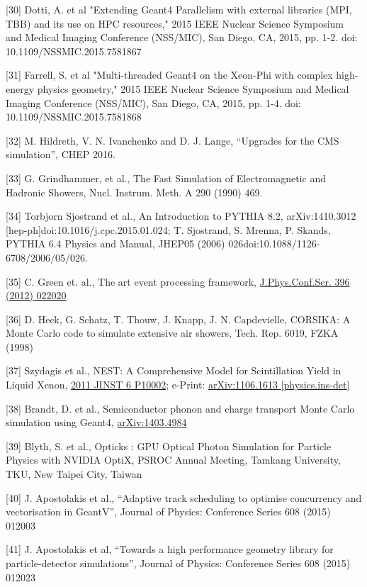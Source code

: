 \documentclass[12pt,a4paper]{article}
\begin{document}
{[}30{]} Dotti, A. et al "Extending Geant4 Parallelism with external
libraries (MPI, TBB) and its use on HPC resources," 2015 IEEE Nuclear
Science Symposium and Medical Imaging Conference (NSS/MIC), San Diego,
CA, 2015, pp. 1-2. doi: 10.1109/NSSMIC.2015.7581867

{[}31{]} Farrell, S. et al "Multi-threaded Geant4 on the Xeon-Phi with
complex high-energy physics geometry," 2015 IEEE Nuclear Science
Symposium and Medical Imaging Conference (NSS/MIC), San Diego, CA, 2015,
pp. 1-4. doi: 10.1109/NSSMIC.2015.7581868

{[}32{]} M. Hildreth, V. N. Ivanchenko and D. J. Lange, ``Upgrades for
the CMS simulation'', CHEP 2016.

{[}33{]} G. Grindhammer, et al., The Fast Simulation of Electromagnetic
and Hadronic Showers, Nucl. Instrum. Meth. A 290 (1990) 469.

{[}34{]} Torbjorn Sjostrand et al., An Introduction to PYTHIA 8.2,
arXiv:1410.3012 {[}hep-ph{]}doi:10.1016/j.cpc.2015.01.024; T. Sjostrand,
S. Mrenna, P. Skands, PYTHIA 6.4 Physics and Manual, JHEP05 (2006)
026doi:10.1088/1126-6708/2006/05/026.

{[}35{]} C. Green et. al., The art event processing framework,
\href{https://inspirehep.net/record/1211020}{J.Phys.Conf.Ser. 396 (2012)
022020}

{[}36{]} D. Heck, G. Schatz, T. Thouw, J. Knapp, J. N. Capdevielle,
CORSIKA: A Monte Carlo code to simulate extensive air showers, Tech.
Rep. 6019, FZKA (1998)

{[}37{]} Szydagis et al., NEST: A Comprehensive Model for Scintillation
Yield in Liquid Xenon,
\href{http://dx.doi.org/10.1088/1748-0221/6/10/P10002}{{2011 JINST 6
P10002}}; e-Print:
\href{http://arxiv.org/abs/1106.1613}{{arXiv:1106.1613
{[}physics.ins-det{]}}}

{[}38{]} Brandt, D. et al., Semiconductor phonon and charge transport
Monte Carlo simulation using Geant4,
\href{https://arxiv.org/abs/1403.4984}{{arXiv:1403.4984}}

{[}39{]} Blyth, S. et al., Opticks : GPU Optical Photon Simulation for
Particle Physics with NVIDIA OptiX, PSROC Annual Meeting, Tamkang
University, TKU, New Taipei City, Taiwan

{[}40{]} J. Apostolakis et al., ``Adaptive track scheduling to optimise
concurrency and vectorisation in GeantV'', Journal of Physics:
Conference Series 608 (2015) 012003

{[}41{]} J. Apostolakis et al, ``Towards a high performance geometry
library for particle-detector simulations'', Journal of Physics:
Conference Series 608 (2015) 012023
\end{document}

